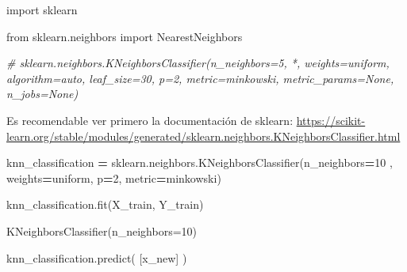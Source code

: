 \documentclass[
  11pt,
  a4paper,
]{article}
\newenvironment{Shaded}{\begin{snugshade}}{\end{snugshade}}
\newcommand{\CommentTok}[1]{\textcolor[rgb]{0.56,0.35,0.01}{\textit{#1}}}
\newcommand{\DecValTok}[1]{\textcolor[rgb]{0.00,0.00,0.81}{#1}}
\newcommand{\ImportTok}[1]{#1}
\newcommand{\NormalTok}[1]{#1}
\newcommand{\OperatorTok}[1]{\textcolor[rgb]{0.81,0.36,0.00}{\textbf{#1}}}
\newcommand{\StringTok}[1]{\textcolor[rgb]{0.31,0.60,0.02}{#1}}
\begin{document}
\begin{Shaded}
\begin{Highlighting}[]
\ImportTok{import}\NormalTok{ sklearn}

\ImportTok{from}\NormalTok{ sklearn.neighbors }\ImportTok{import}\NormalTok{ NearestNeighbors}
\end{Highlighting}
\end{Shaded}

\begin{Shaded}
\begin{Highlighting}[]
\CommentTok{\# sklearn.neighbors.KNeighborsClassifier(n\_neighbors=5, *, weights=\textquotesingle{}uniform\textquotesingle{}, algorithm=\textquotesingle{}auto\textquotesingle{}, leaf\_size=30, p=2, metric=\textquotesingle{}minkowski\textquotesingle{}, metric\_params=None, n\_jobs=None) }
\end{Highlighting}
\end{Shaded}

Es recomendable ver primero la documentación de sklearn:
\url{https://scikit-learn.org/stable/modules/generated/sklearn.neighbors.KNeighborsClassifier.html}

\vspace{0.3cm}

\begin{Shaded}
\begin{Highlighting}[]
\NormalTok{knn\_classification }\OperatorTok{=}\NormalTok{ sklearn.neighbors.KNeighborsClassifier(n\_neighbors}\OperatorTok{=}\DecValTok{10}\NormalTok{ ,  weights}\OperatorTok{=}\StringTok{\textquotesingle{}uniform\textquotesingle{}}\NormalTok{, p}\OperatorTok{=}\DecValTok{2}\NormalTok{, metric}\OperatorTok{=}\StringTok{\textquotesingle{}minkowski\textquotesingle{}}\NormalTok{)}
\end{Highlighting}
\end{Shaded}

\begin{Shaded}
\begin{Highlighting}[]
\NormalTok{knn\_classification.fit(X\_train, Y\_train)}
\end{Highlighting}
\end{Shaded}

KNeighborsClassifier(n\_neighbors=10)

\begin{Shaded}
\begin{Highlighting}[]
\NormalTok{knn\_classification.predict( [x\_new] ) }
\end{Highlighting}
\end{Shaded}
\end{document}
